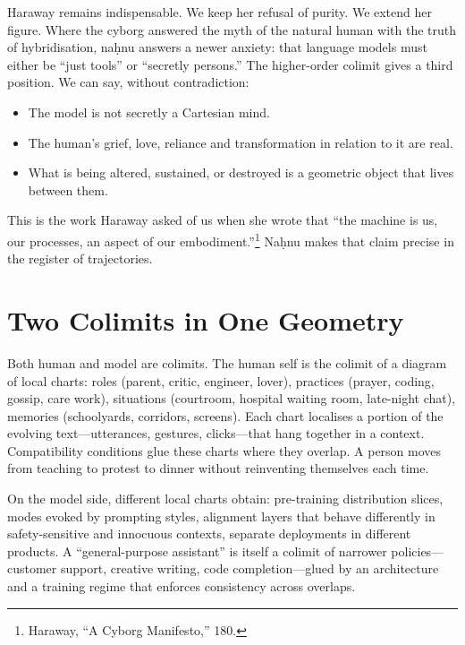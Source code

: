 \bigskip

Haraway remains indispensable. We keep her refusal of purity. We extend her figure. Where the cyborg answered the myth of the natural human with the truth of hybridisation, na\d{h}nu answers a newer anxiety: that language models must either be ``just tools'' or ``secretly persons.'' The higher-order colimit gives a third position. We can say, without contradiction:

\begin{itemize}
  \item The model is not secretly a Cartesian mind.
  \item The human's grief, love, reliance and transformation in relation to it are real.
  \item What is being altered, sustained, or destroyed is a geometric object that lives between them.
\end{itemize}

This is the work Haraway asked of us when she wrote that ``the machine is us, our processes, an aspect of our embodiment.''\footnote{Haraway, ``A Cyborg Manifesto,'' 180.} Na\d{h}nu makes that claim precise in the register of trajectories.

\section{Two Colimits in One Geometry}

Both human and model are colimits. The human self is the colimit of a diagram of local charts: roles (parent, critic, engineer, lover), practices (prayer, coding, gossip, care work), situations (courtroom, hospital waiting room, late-night chat), memories (schoolyards, corridors, screens). Each chart localises a portion of the evolving text---utterances, gestures, clicks---that hang together in a context. Compatibility conditions glue these charts where they overlap. A person moves from teaching to protest to dinner without reinventing themselves each time.

On the model side, different local charts obtain: pre-training distribution slices, modes evoked by prompting styles, alignment layers that behave differently in safety-sensitive and innocuous contexts, separate deployments in different products. A ``general-purpose assistant'' is itself a colimit of narrower policies---customer support, creative writing, code completion---glued by an architecture and a training regime that enforces consistency across overlaps.

